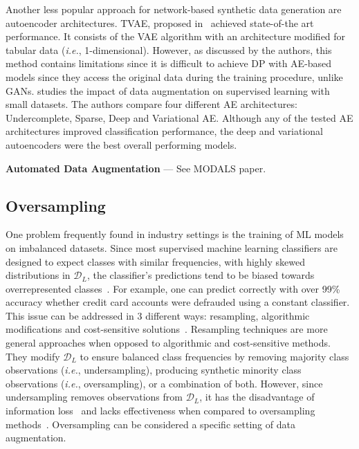 \documentclass[parskip=full]{scrartcl}
\begin{document}
Another less popular approach for network-based synthetic data generation are
autoencoder architectures. TVAE, proposed in~\cite{xu2019modeling} achieved
state-of-the art performance.  It consists of the VAE algorithm with an
architecture modified for tabular data (\textit{i.e.}, 1-dimensional).
However, as discussed by the authors, this method contains limitations since
it is difficult to achieve DP with AE-based models since they access the
original data during the training procedure, unlike GANs.
\citet{delgado2021deep} studies the impact of data augmentation on supervised
learning with small datasets. The authors compare four different AE
architectures: Undercomplete, Sparse, Deep and Variational AE\@. Although any
of the tested AE architectures improved classification performance, the deep
and variational autoencoders were the best overall performing models.

\textbf{Automated Data Augmentation} --- See MODALS paper.

\subsection{Oversampling}\label{sec:oversampling}

One problem frequently found in industry settings is the training of ML models
on imbalanced datasets. Since most supervised machine learning classifiers are
designed to expect classes with similar frequencies, with highly skewed
distributions in $\mathcal{D}_L$, the classifier’s predictions tend to be
biased towards overrepresented classes~\cite{fonseca2021improving}. For
example, one can predict correctly with over 99\% accuracy whether credit card
accounts were defrauded using a constant classifier. This issue can be
addressed in 3 different ways: resampling, algorithmic modifications and
cost-sensitive solutions~\cite{douzas2019imbalanced}. Resampling techniques
are more general approaches when opposed to algorithmic and cost-sensitive
methods. They modify $\mathcal{D}_L$ to ensure balanced class frequencies by
removing majority class observations (\textit{i.e.}, undersampling), producing
synthetic minority class observations (\textit{i.e.}, oversampling), or a
combination of both. However, since undersampling removes observations from
$\mathcal{D}_L$, it has the disadvantage of information
loss~\cite{feng2019imbalanced} and lacks effectiveness when compared to
oversampling methods~\cite{mohammed2020machine, hernandez2013empirical}.
Oversampling can be considered a specific setting of data augmentation.
\end{document}
